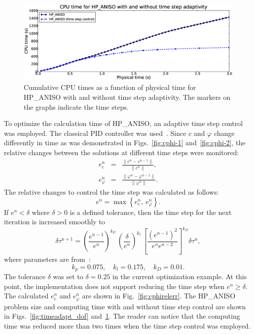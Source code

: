 \begin{figure}[!ht]
  \begin{centering}
  \includegraphics[width=\columnwidth]{timeadapt_cpu}
  \caption{\label{fig:timeadapt_cpu} Cumulative CPU times
  as a function of physical time for HP\_ANISO with and without
  time step adaptivity. The markers on the graphs indicate the
  time steps.}
  \end{centering}
\end{figure}

To optimize the calculation time of HP\_ANISO, an adaptive time step control was employed.
The classical PID controller was used~\cite{valli2002control,dubcova2010space}.
Since $c$ and $\varphi$ change differently in time as was demonstrated in Figs.~\ref{fig:cphi-1}
and~\ref{fig:cphi-2}, the relative changes between the solutions at different
time steps were monitored:
\begin{eqnarray}
  e_c^n & = & \frac{\lVert c^n-c^{n-1}\rVert}{\lVert c^n \rVert},\\
  e_\varphi^n & = & \frac{\lVert \varphi^n-\varphi^{n-1}\rVert}{\lVert \varphi^n \rVert}.
\end{eqnarray}
The relative changes to control the time step was calculated as follows:
\begin{equation}
  e^n=\max\left\{ e_c^n,\ e_\varphi^n \right\}.
\end{equation}
If $e^n < \delta$ where $\delta>0$ is a defined tolerance, then the time
step for the next iteration is increased smoothly to
\begin{equation}
  \delta\tau^{n+1}=\left( \frac{e^{n-1}}{e^n} \right)^{k_P}\ \left( \frac{\delta}{e^n} \right)^{k_l}\
  \left[ \frac{\left( e^{n-1} \right)^2}{e^n e^{n-2}} \right]^{k_D} \delta\tau^n,
\end{equation}
where parameters are from~\cite{valli2002control}:
\begin{equation}
  k_p=0.075,\quad k_l=0.175,\quad k_D=0.01.
\end{equation}
The tolerance $\delta$ was set to $\delta=0.25$ in the current optimization
example. At this point, the implementation does not support
reducing the time step when $e^n\geq \delta$. The calculated $e_c^n$ and $e_\varphi^n$ are shown in Fig.~\ref{fig:cphirelerr}.
The HP\_ANISO problem size and computing time with and without time step control
are shown in Figs.~\ref{fig:timeadapt_dof} and~\ref{fig:timeadapt_cpu}. The reader
can notice that the computing time was reduced more than two times when the time
step control was employed.

